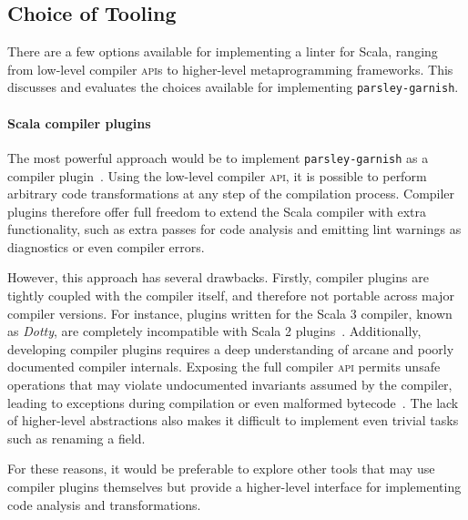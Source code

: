 \documentclass[../../main.tex]{subfiles}
\begin{document}
\subsection{Choice of Tooling}\label{sec:choice-of-tooling}
There are a few options available for implementing a linter for Scala, ranging from low-level compiler \textsc{api}s to higher-level metaprogramming frameworks.
This  discusses and evaluates the choices available for implementing \texttt{parsley-garnish}.

\paragraph{Scala compiler plugins}
The most powerful approach would be to implement \texttt{parsley-garnish} as a compiler plugin~\cite{pickering_plugins_2019}.
Using the low-level compiler \textsc{api}, it is possible to perform arbitrary code transformations at any step of the compilation process.
Compiler plugins therefore offer full freedom to extend the Scala compiler with extra functionality, such as extra passes for code analysis and emitting lint warnings as diagnostics or even compiler errors.

However, this approach has several drawbacks.
Firstly, compiler plugins are tightly coupled with the compiler itself, and therefore not portable across major compiler versions.
For instance, plugins written for the Scala 3 compiler, known as \emph{Dotty}, are completely incompatible with Scala 2 plugins~\cite{lampepfl_changes_2022}.
Additionally, developing compiler plugins requires a deep understanding of arcane and poorly documented compiler internals.
Exposing the full compiler \textsc{api} permits unsafe operations that may violate undocumented invariants assumed by the compiler, leading to exceptions during compilation or even malformed bytecode~\cite{sherwany_refactoring_2015}.
The lack of higher-level abstractions also makes it difficult to implement even trivial tasks such as renaming a field.

For these reasons, it would be preferable to explore other tools that may use compiler plugins themselves but provide a higher-level interface for implementing code analysis and transformations.
\end{document}
